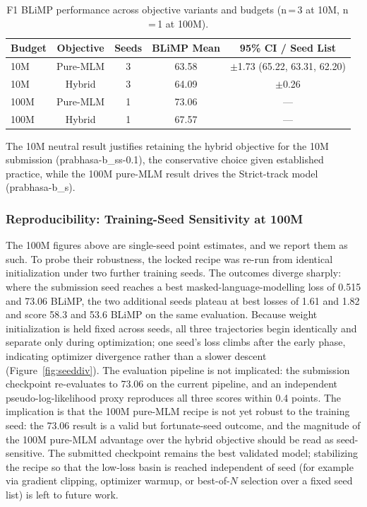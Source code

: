 \begin{table}[t]
\centering
\caption{F1 BLiMP performance across objective variants and budgets (n\,=\,3 at 10M, n\,=\,1 at 100M).}
\label{tab:f1_objective}
{\small
\begin{tabular}{lcccc}
\toprule
Budget & Objective & Seeds & BLiMP Mean & 95\% CI / Seed List \\
\midrule
10M & Pure-MLM & 3 & 63.58 & \({\pm}\)1.73 (65.22, 63.31, 62.20) \\
10M & Hybrid & 3 & 64.09 & \({\pm}\)0.26 \\
\midrule
100M & Pure-MLM & 1 & 73.06 & — \\
100M & Hybrid & 1 & 67.57 & — \\
\bottomrule
\end{tabular}
}
\end{table}

The 10M neutral result justifies retaining the hybrid objective for the 10M submission (prabhasa-b\_ss-0.1), the conservative choice given established practice, while the 100M pure-MLM result drives the Strict-track model (prabhasa-b\_s).

\subsubsection{Reproducibility: Training-Seed Sensitivity at 100M}
\label{subsubsec:seedsens}

The 100M figures above are single-seed point estimates, and we report them as such. To probe their robustness, the locked recipe was re-run from identical initialization under two further training seeds. The outcomes diverge sharply: where the submission seed reaches a best masked-language-modelling loss of 0.515 and 73.06 BLiMP, the two additional seeds plateau at best losses of 1.61 and 1.82 and score 58.3 and 53.6 BLiMP on the same evaluation. Because weight initialization is held fixed across seeds, all three trajectories begin identically and separate only during optimization; one seed's loss climbs after the early phase, indicating optimizer divergence rather than a slower descent (Figure~\ref{fig:seeddiv}). The evaluation pipeline is not implicated: the submission checkpoint re-evaluates to 73.06 on the current pipeline, and an independent pseudo-log-likelihood proxy reproduces all three scores within 0.4 points. The implication is that the 100M pure-MLM recipe is not yet robust to the training seed: the 73.06 result is a valid but fortunate-seed outcome, and the magnitude of the 100M pure-MLM advantage over the hybrid objective should be read as seed-sensitive. The submitted checkpoint remains the best validated model; stabilizing the recipe so that the low-loss basin is reached independent of seed (for example via gradient clipping, optimizer warmup, or best-of-$N$ selection over a fixed seed list) is left to future work.

